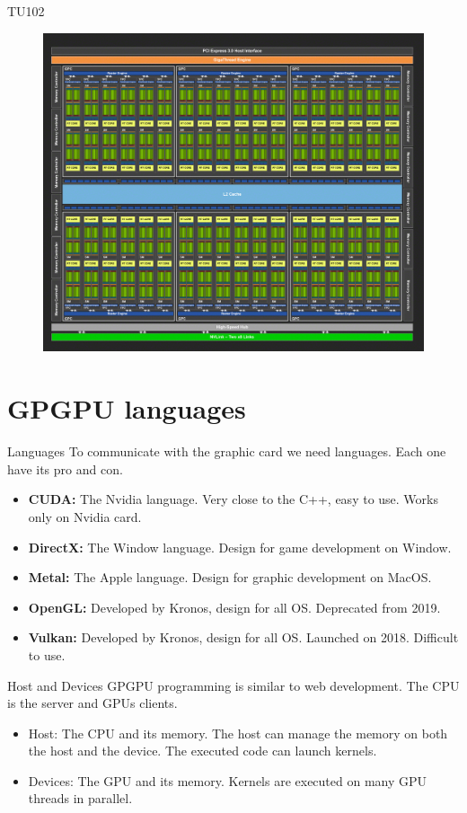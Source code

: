 \documentclass{beamer}
\begin{document}
\begin{frame}{TU102}
	\begin{figure}
		\includegraphics[scale=0.11]{figures/TU102_2.png}
	\end{figure}
\end{frame}

\section{GPGPU languages}
\begin{frame}{Languages}
	To communicate with the graphic card we need languages. Each one have its pro and con.
	\begin{itemize}
		\item \textbf{CUDA:} The Nvidia language. Very close to the C++, easy to use. Works only on Nvidia card.
		\item \textbf{DirectX:} The Window language. Design for game development on Window.
		\item \textbf{Metal:} The Apple language. Design for graphic development on MacOS.
		\item \textbf{OpenGL:} Developed by Kronos, design for all OS. Deprecated from 2019.
		\item \textbf{Vulkan:} Developed by Kronos, design for all OS. Launched on 2018. Difficult to use.
	\end{itemize}
\end{frame}

\begin{frame}{Host and Devices}
	GPGPU programming is similar to web development. The CPU is the server and GPUs clients.
	\begin{itemize}
		\item Host: The CPU and its memory. The host can manage the memory on both the host and the device. The executed code can launch kernels.
		\item Devices: The GPU and its memory. Kernels are executed on many GPU threads in parallel.
	\end{itemize}
\end{frame}
\end{document}
